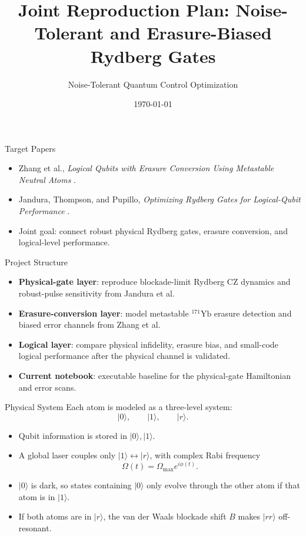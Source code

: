 \documentclass[aspectratio=169]{beamer}
\title[Noise-Tolerant Rydberg Gates]{Joint Reproduction Plan: Noise-Tolerant and Erasure-Biased Rydberg Gates}
\author{Noise-Tolerant Quantum Control Optimization}
\date{\today}
\begin{document}
\begin{frame}
  \titlepage
\end{frame}

\begin{frame}{Target Papers}
  \begin{itemize}
    \item Zhang et al., \emph{Logical Qubits with Erasure Conversion Using Metastable Neutral Atoms} \cite{zhangLogicalQubitsErasure2026}.
    \item Jandura, Thompson, and Pupillo, \emph{Optimizing Rydberg Gates for Logical-Qubit Performance} \cite{janduraOptimizingRydbergGates2023}.
    \item Joint goal: connect robust physical Rydberg gates, erasure conversion, and logical-level performance.
  \end{itemize}
\end{frame}

\begin{frame}{Project Structure}
  \begin{itemize}
    \item \textbf{Physical-gate layer}: reproduce blockade-limit Rydberg CZ dynamics and robust-pulse sensitivity from Jandura et al.
    \item \textbf{Erasure-conversion layer}: model metastable \(^{171}\mathrm{Yb}\) erasure detection and biased error channels from Zhang et al.
    \item \textbf{Logical layer}: compare physical infidelity, erasure bias, and small-code logical performance after the physical channel is validated.
    \item \textbf{Current notebook}: executable baseline for the physical-gate Hamiltonian and error scans.
  \end{itemize}
\end{frame}

\begin{frame}{Physical System}
  Each atom is modeled as a three-level system:
  \[
    |0\rangle,\qquad |1\rangle,\qquad |r\rangle .
  \]
  \begin{itemize}
    \item Qubit information is stored in \(|0\rangle,|1\rangle\).
    \item A global laser couples only \(|1\rangle \leftrightarrow |r\rangle\), with complex Rabi frequency
      \[
        \Omega(t)=\Omega_{\max}e^{i\phi(t)} .
      \]
    \item \(|0\rangle\) is dark, so states containing \(|0\rangle\) only evolve through the other atom if that atom is in \(|1\rangle\).
    \item If both atoms are in \(|r\rangle\), the van der Waals blockade shift \(B\) makes \(|rr\rangle\) off-resonant.
  \end{itemize}
\end{frame}
\end{document}
